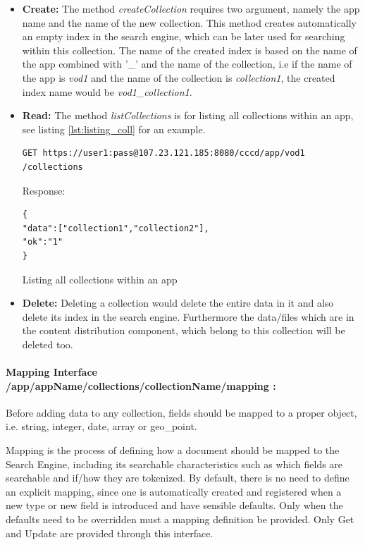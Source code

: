 \begin{itemize}
\item \textbf{Create:} The method \textit{createCollection} requires two argument, namely the app name and the name of the new collection. This method creates automatically an empty index in the search engine, which can be later used for searching within this collection. The name of the created index is based on the name of the app combined with '\_' and the name of the collection, i.e if the name of the app is \textit{vod1} and the name of the collection is \textit{collection1}, the created index name would be \textit{vod1\_collection1}.

\item \textbf{Read:} The method \textit{listCollections} is for listing all collections within an app, see listing \ref{lst:listing_coll} for an example.

\begin{code}
\begin{verbatim}
GET https://user1:pass@107.23.121.185:8080/cccd/app/vod1
/collections
\end{verbatim}
Response:
\begin{verbatim}
{
"data":["collection1","collection2"],
"ok":"1"
}
\end{verbatim}
\caption{Listing all collections within an app}
\label{lst:listing_coll}
\end{code}

\item \textbf{Delete:} Deleting a collection would delete the entire data in it and also delete its index in the search engine. Furthermore the data/files which are in the content distribution component, which belong to this collection will be deleted too.
\end{itemize}

\paragraph{Mapping Interface /app/{appName}/collections/{collectionName}/mapping :\label{sec:des_rest_api_mapping}} Before adding data to any collection, fields should be mapped to a proper object, i.e. string, integer, date, array or geo\_point. 

Mapping is the process of defining how a document should be mapped to the Search Engine, including its searchable characteristics such as which fields are searchable and if/how they are tokenized.  By default, there is no need to define an explicit mapping, since one is automatically created and registered when a new type or new field is introduced and have sensible defaults. Only when the defaults need to be overridden must a mapping definition be provided. Only Get and Update are provided through this interface.
 
